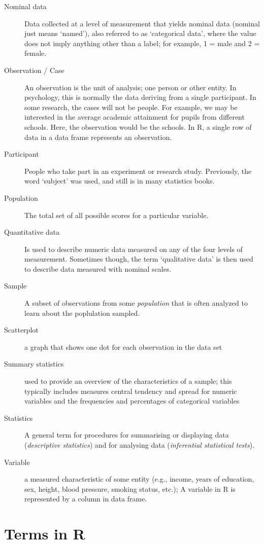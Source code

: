\documentclass[
]{book}
\begin{document}
\begin{description}
\item[Nominal data]
Data collected at a level of measurement that yields nominal data (nominal just means `named'), also referred to as `categorical data', where the value does not imply anything other than a label; for example, 1 = male and 2 = female.
\item[Observation / Case]
An observation is the unit of analysis; one person or other entity. In psychology, this is normally the data deriving from a single participant. In some research, the cases will not be people. For example, we may be interested in the average academic attainment for pupils from different schools. Here, the observation would be the schools. In R, a single row of data in a data frame represents an observation.
\item[Participant]
People who take part in an experiment or research study. Previously, the word `subject' was used, and still is in many statistics books.
\item[Population]
The total set of all possible scores for a particular variable.
\item[Quantitative data]
Is used to describe numeric data measured on any of the four levels of measurement. Sometimes though, the term `qualitative data' is then used to describe data measured with nominal scales.
\item[Sample]
A subset of observations from some \emph{population} that is often analyzed to learn about the poplulation sampled.
\item[Scatterplot]
a graph that shows one dot for each observation in the data set
\item[Summary statistics]
used to provide an overview of the characteristics of a sample; this typically includes measures central tendency and spread for numeric variables and the frequencies and percentages of categorical variables
\item[Statistics]
A general term for procedures for summarising or displaying data (\emph{descriptive statistics}) and for analysing data (\emph{inferential statistical tests}).
\item[Variable]
a measured characteristic of some entity (e.g., income, years of education, sex, height, blood pressure, smoking status, etc.); A variable in R is represented by a column in data frame.
\end{description}

\hypertarget{terms-in-r}{%
\section{Terms in R}\label{terms-in-r}}
\end{document}
